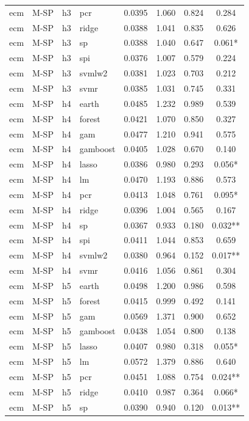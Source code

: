 \begin{ThreePartTable}
\begin{longtable}[t]{llclcccc}
ecm & M-SP & h3 & pcr & 0.0395 & 1.060 & 0.824 & 0.284\\
ecm & M-SP & h3 & ridge & 0.0388 & 1.041 & 0.835 & 0.626\\
ecm & M-SP & h3 & sp & 0.0388 & 1.040 & 0.647 & 0.061*\\
ecm & M-SP & h3 & spi & 0.0376 & 1.007 & 0.579 & 0.224\\
ecm & M-SP & h3 & svmlw2 & 0.0381 & 1.023 & 0.703 & 0.212\\
ecm & M-SP & h3 & svmr & 0.0385 & 1.031 & 0.745 & 0.331\\
\addlinespace
ecm & M-SP & h4 & earth & 0.0485 & 1.232 & 0.989 & 0.539\\
ecm & M-SP & h4 & forest & 0.0421 & 1.070 & 0.850 & 0.327\\
ecm & M-SP & h4 & gam & 0.0477 & 1.210 & 0.941 & 0.575\\
ecm & M-SP & h4 & gamboost & 0.0405 & 1.028 & 0.670 & 0.140\\
ecm & M-SP & h4 & lasso & 0.0386 & 0.980 & 0.293 & 0.056*\\
ecm & M-SP & h4 & lm & 0.0470 & 1.193 & 0.886 & 0.573\\
ecm & M-SP & h4 & pcr & 0.0413 & 1.048 & 0.761 & 0.095*\\
ecm & M-SP & h4 & ridge & 0.0396 & 1.004 & 0.565 & 0.167\\
ecm & M-SP & h4 & sp & 0.0367 & 0.933 & 0.180 & 0.032**\\
ecm & M-SP & h4 & spi & 0.0411 & 1.044 & 0.853 & 0.659\\
ecm & M-SP & h4 & svmlw2 & 0.0380 & 0.964 & 0.152 & 0.017**\\
ecm & M-SP & h4 & svmr & 0.0416 & 1.056 & 0.861 & 0.304\\
\addlinespace
ecm & M-SP & h5 & earth & 0.0498 & 1.200 & 0.986 & 0.598\\
ecm & M-SP & h5 & forest & 0.0415 & 0.999 & 0.492 & 0.141\\
ecm & M-SP & h5 & gam & 0.0569 & 1.371 & 0.900 & 0.652\\
ecm & M-SP & h5 & gamboost & 0.0438 & 1.054 & 0.800 & 0.138\\
ecm & M-SP & h5 & lasso & 0.0407 & 0.980 & 0.318 & 0.055*\\
ecm & M-SP & h5 & lm & 0.0572 & 1.379 & 0.886 & 0.640\\
ecm & M-SP & h5 & pcr & 0.0451 & 1.088 & 0.754 & 0.024**\\
ecm & M-SP & h5 & ridge & 0.0410 & 0.987 & 0.364 & 0.066*\\
ecm & M-SP & h5 & sp & 0.0390 & 0.940 & 0.120 & 0.013**\\

\end{longtable}
\end{ThreePartTable}
